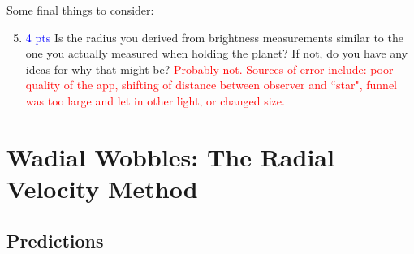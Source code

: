 \documentclass[11pt]{article}
\begin{document}
\medskip \noindent
Some final things to consider:
\begin{enumerate}
\setcounter{enumi}{4}
    \item \textcolor{blue}{4 pts} Is the radius you derived from brightness measurements similar to the one you actually measured when holding the planet? If not, do you have any ideas for why that might be? \textcolor{red}{Probably not. Sources of error include: poor quality of the app, shifting of distance between observer and ``star", funnel was too large and let in other light, or changed size.}
\end{enumerate}


\section{Wadial Wobbles: The Radial Velocity Method}
\subsection{Predictions} \label{sec:RV_predictions}
\end{document}
